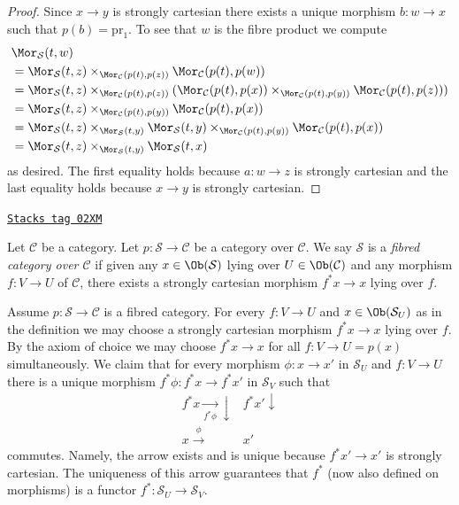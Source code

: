\begin{proof}
Since $x \to y$ is strongly cartesian there exists a unique morphism
$b : w \to x$ such that $p(b) = \text{pr}_1$. To see that $w$ is the
fibre product we compute
\begin{align*}
& \Mor_\mathcal{S}(t, w) \\
& = \Mor_\mathcal{S}(t, z)
\times_{\Mor_\mathcal{C}(p(t), p(z))}
\Mor_\mathcal{C}(p(t), p(w)) \\
& = \Mor_\mathcal{S}(t, z)
\times_{\Mor_\mathcal{C}(p(t), p(z))}
(\Mor_\mathcal{C}(p(t), p(x))
\times_{\Mor_\mathcal{C}(p(t), p(y))}
\Mor_\mathcal{C}(p(t), p(z))) \\
& = \Mor_\mathcal{S}(t, z)
\times_{\Mor_\mathcal{C}(p(t), p(y))}
\Mor_\mathcal{C}(p(t), p(x)) \\
& = \Mor_\mathcal{S}(t, z)
\times_{\Mor_\mathcal{S}(t, y)}
\Mor_\mathcal{S}(t, y)
\times_{\Mor_\mathcal{C}(p(t), p(y))}
\Mor_\mathcal{C}(p(t), p(x)) \\
& = \Mor_\mathcal{S}(t, z)
\times_{\Mor_\mathcal{S}(t, y)}
\Mor_\mathcal{S}(t, x)
\end{align*}
as desired. The first equality holds because $a : w \to z$ is strongly
cartesian and the last equality holds because $x \to y$ is strongly
cartesian.
\end{proof}

\begin{definition}
\label{categories-definition-fibred-category}
\href{https://stacks.math.columbia.edu/tag/02XM}{\texttt{Stacks tag 02XM}}

Let $\mathcal{C}$ be a category.
Let $p : \mathcal{S} \to \mathcal{C}$ be a category over $\mathcal{C}$.
We say $\mathcal{S}$ is a {\it fibred category over $\mathcal{C}$}
if given any $x \in \Ob(\mathcal{S})$ lying over
$U \in \Ob(\mathcal{C})$ and any morphism $f : V \to U$ of
$\mathcal{C}$, there exists a strongly cartesian morphism $f^*x \to x$
lying over $f$.
\end{definition}

Assume $p : \mathcal{S} \to \mathcal{C}$ is a fibred category.
For every $f : V \to U$ and $x\in \Ob(\mathcal{S}_U)$
as in the definition we may choose a strongly cartesian morphism
$f^\ast x \to x$ lying over $f$. By the axiom of choice we may choose
$f^*x \to x$ for all $f: V \to U = p(x)$ simultaneously.
We claim that for every morphism $\phi : x \to x'$ in $\mathcal{S}_U$
and $f : V \to U$ there is a unique
morphism $f^\ast \phi : f^\ast x \to f^\ast x'$ in $\mathcal{S}_V$
such that
$$
\begin{array}{cc}f^\ast x \underset{f^\ast \phi}{\longrightarrow}\downarrow & f^\ast x' \downarrow \\ x \overset{\phi}{\longrightarrow} & x'\end{array}
$$
commutes. Namely, the arrow exists and is unique because $f^*x' \to x'$ is
strongly cartesian. The uniqueness of this arrow guarantees that
$f^\ast$ (now also defined on morphisms) is a
functor $ f^\ast : \mathcal{S}_U \to \mathcal{S}_V$.

